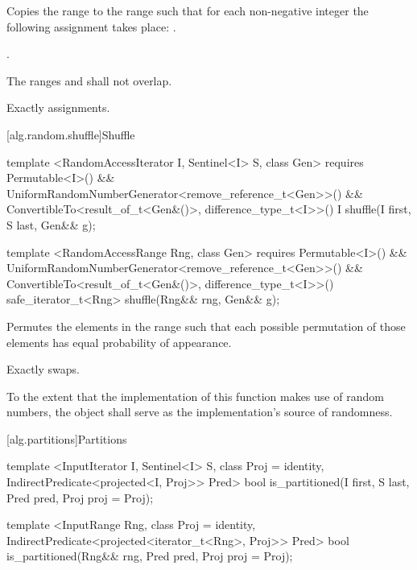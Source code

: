 \begin{itemdescr}
\pnum
\effects
Copies the range
to the range
such that for each non-negative integer
the following assignment takes place:
.

\pnum
\returns
{}.

\pnum
\requires
The ranges
and
shall not overlap.

\pnum
\complexity
Exactly
assignments.
\end{itemdescr}

[alg.random.shuffle]{Shuffle}

%
\begin{itemdecl}
template <RandomAccessIterator I, Sentinel<I> S, class Gen>
  requires Permutable<I>() &&
    UniformRandomNumberGenerator<remove_reference_t<Gen>>() &&
    ConvertibleTo<result_of_t<Gen&()>, difference_type_t<I>>()
  I shuffle(I first, S last, Gen&& g);

template <RandomAccessRange Rng, class Gen>
  requires Permutable<I>() &&
    UniformRandomNumberGenerator<remove_reference_t<Gen>>() &&
    ConvertibleTo<result_of_t<Gen&()>, difference_type_t<I>>()
  safe_iterator_t<Rng>
    shuffle(Rng&& rng, Gen&& g);
\end{itemdecl}

\begin{itemdescr}
\pnum
\effects
Permutes the elements in the range
such that each possible permutation of those elements has equal probability of appearance.

\pnum
\complexity
Exactly
swaps.

\pnum
\returns {}

\pnum
\notes
To the extent that the implementation of this function makes use of random
numbers, the object  shall serve as the implementation's source of
randomness.

\end{itemdescr}

[alg.partitions]{Partitions}

%
\begin{itemdecl}
template <InputIterator I, Sentinel<I> S, class Proj = identity,
    IndirectPredicate<projected<I, Proj>> Pred>
  bool is_partitioned(I first, S last, Pred pred, Proj proj = Proj{});

template <InputRange Rng, class Proj = identity,
    IndirectPredicate<projected<iterator_t<Rng>, Proj>> Pred>
  bool
    is_partitioned(Rng&& rng, Pred pred, Proj proj = Proj{});
\end{itemdecl}

